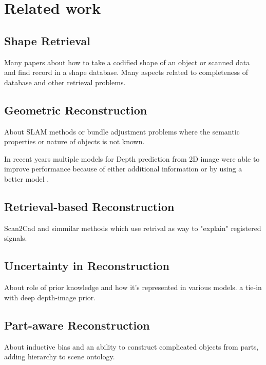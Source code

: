 \chapter{Related work}

\section{Shape Retrieval}
\label{sec:shape_retrieval}

Many papers about how to take a codified shape of an object or scanned data and find record in a shape database. Many aspects related to completeness of database and other retrieval problems.




\section{Geometric Reconstruction}
\label{sec:geometric_reconstruction}

About SLAM methods or bundle adjustment problems where the semantic properties or nature of objects is not known.

In recent years multiple models for Depth prediction from 2D image were able to improve performance because of either additional information or by using a better model \cite{jiao2018look,tatarchenko2019single,kendall2018multi}.



\section{Retrieval-based Reconstruction}
\label{sec:retrieval_reconstruction}

Scan2Cad and simmilar methods which use retrival as way to "explain" registered signals.

\section{Uncertainty in Reconstruction}
\label{sec:uncertainty_reconstruction}

About role of prior knowledge and how it's represented in various models. a tie-in with deep depth-image prior.

\section{Part-aware Reconstruction}
\label{sec:part_reconstruction}



About inductive bias and an ability to construct complicated objects from parts, adding hierarchy to scene ontology.